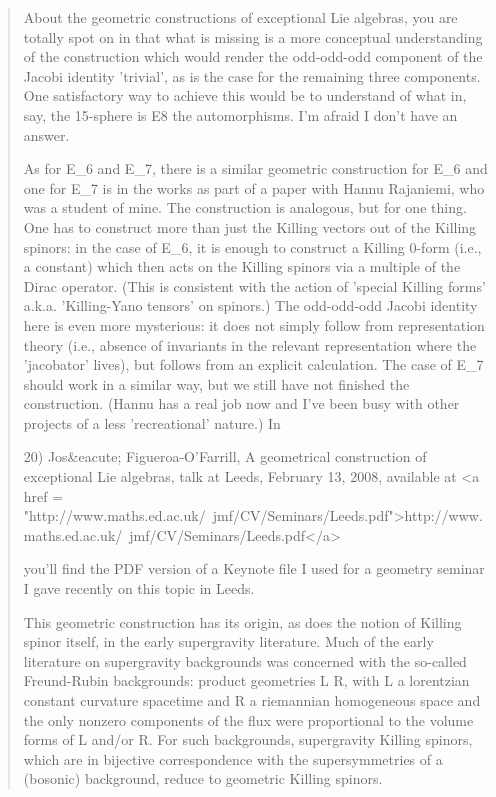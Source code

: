 \begin{quote}

About the geometric constructions of exceptional Lie algebras, you are
totally spot on in that what is missing is a more conceptual
understanding of the construction which would render the odd-odd-odd
component of the Jacobi identity 'trivial', as is the case for the
remaining three components.  One satisfactory way to achieve this
would be to understand of what in, say, the 15-sphere is E8 the
automorphisms.  I'm afraid I don't have an answer.

As for E_{6} and E_{7}, there is a similar geometric
construction for E_{6} and one for E_{7} is in the
works as part of a paper with Hannu Rajaniemi, who was a student of
mine.  The construction is analogous, but for one thing.  One has to
construct more than just the Killing vectors out of the Killing
spinors: in the case of E_{6}, it is enough to construct a
Killing 0-form (i.e., a constant) which then acts on the Killing
spinors via a multiple of the Dirac operator.  (This is consistent
with the action of 'special Killing forms' a.k.a. 'Killing-Yano
tensors' on spinors.)  The odd-odd-odd Jacobi identity here is even
more mysterious: it does not simply follow from representation theory
(i.e., absence of invariants in the relevant representation where the
'jacobator' lives), but follows from an explicit calculation.  The
case of E_{7} should work in a similar way, but we still have
not finished the construction.  (Hannu has a real job now and I've
been busy with other projects of a less 'recreational' nature.)  In

20) Jos&eacute; Figueroa-O'Farrill, A geometrical construction of exceptional
Lie algebras, talk at Leeds, February 13, 2008, available at <a href = "http://www.maths.ed.ac.uk/~jmf/CV/Seminars/Leeds.pdf">http://www.maths.ed.ac.uk/~jmf/CV/Seminars/Leeds.pdf</a>

you'll find the PDF version of a Keynote file I used for a geometry
seminar I gave recently on this topic in Leeds.

This geometric construction has its origin, as does the notion of
Killing spinor itself, in the early supergravity literature.  Much of
the early literature on supergravity backgrounds was concerned with
the so-called Freund-Rubin backgrounds: product geometries L \times  R, with
L a lorentzian constant curvature spacetime and R a riemannian
homogeneous space and the only nonzero components of the flux were
proportional to the volume forms of L and/or R.  For such backgrounds,
supergravity Killing spinors, which are in bijective correspondence
with the supersymmetries of a (bosonic) background, reduce to
geometric Killing spinors.


\end{quote}
